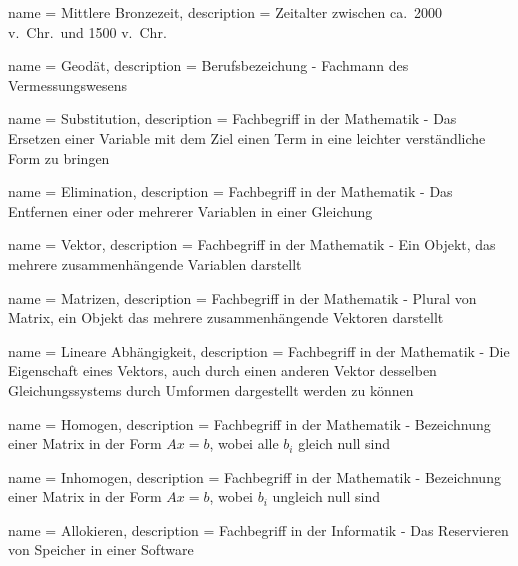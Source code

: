 
{
    name = Mittlere Bronzezeit,
    description = {Zeitalter zwischen ca.\ 2000 v.\ Chr.\ und 1500 v.\ Chr.}
}

{
    name = Geodät,
    description = {Berufsbezeichung - Fachmann des Vermessungswesens}
}

{
    name = Substitution,
    description = {Fachbegriff in der Mathematik - Das Ersetzen einer Variable mit dem Ziel einen Term in eine
leichter verständliche Form zu bringen}
}

{
    name = Elimination,
    description = {Fachbegriff in der Mathematik - Das Entfernen einer oder mehrerer Variablen in einer Gleichung}
}

{
    name = Vektor,
    description = {Fachbegriff in der Mathematik - Ein Objekt, das mehrere zusammenhängende Variablen darstellt}
}

{
    name = Matrizen,
    description = {Fachbegriff in der Mathematik - Plural von Matrix, ein Objekt das mehrere zusammenhängende
Vektoren darstellt}
}

{
    name = Lineare Abhängigkeit,
    description = {Fachbegriff in der Mathematik - Die Eigenschaft eines Vektors, auch durch einen anderen Vektor
desselben Gleichungssystems durch Umformen dargestellt werden zu können}
}

{
    name = Homogen,
    description = {Fachbegriff in der Mathematik - Bezeichnung einer Matrix in der Form $Ax=b$, wobei alle $b_i$ gleich
null sind}
}

{
    name = Inhomogen,
    description = {Fachbegriff in der Mathematik - Bezeichnung einer Matrix in der Form $Ax=b$, wobei $b_i$ ungleich
null sind}
}

{
    name = Allokieren,
    description = {Fachbegriff in der Informatik - Das Reservieren von Speicher in einer Software}
}


